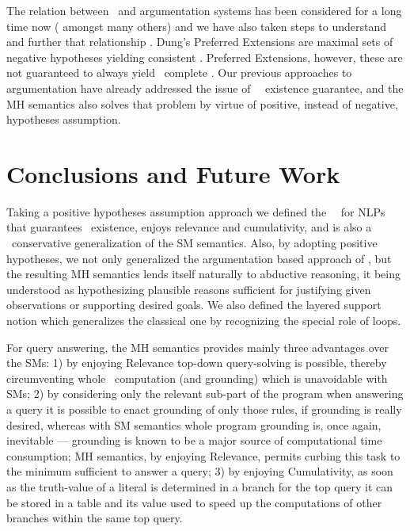 \documentclass{llncs}
\begin{document}
			The relation between \lps\ and argumentation systems has been considered for a long time now
			(\cite{dung95acceptability}	
amongst many others)
			and we have also taken steps to understand and further that relationship
			\cite{Pereira:2007fv,lmp:arg07,lmp_amp_oppositional_concepts_chapter}.
			Dung's Preferred Extensions \cite{dung95acceptability} are maximal sets of negative hypotheses yielding consistent \ms.
			Preferred Extensions, however, these are not guaranteed to always yield \twov\ complete \ms.
			Our previous approaches \cite{Pereira:2007fv,lmp:arg07} to argumentation have already addressed the issue of \twov\ \m\ existence
			guarantee, and the MH semantics also solves that problem by virtue of positive, instead of negative, hypotheses assumption.
					


	\section{Conclusions and Future Work}
		Taking a positive hypotheses assumption approach we defined the \twov\ \MHs\ for NLPs that guarantees \m\ existence, enjoys relevance
		and cumulativity, and is also a \m\ conservative generalization of the SM semantics.
		Also, by adopting positive hypotheses, we not only generalized the argumentation based approach of \cite{dung95acceptability}, but the
		resulting MH semantics lends itself naturally to abductive reasoning, it being understood as hypothesizing plausible reasons sufficient for
		justifying given observations or supporting desired goals.
		We also defined the layered support notion which generalizes the classical one by recognizing the special role of loops.
		
		For query answering, the MH semantics provides mainly three advantages over the SMs:
		1) by enjoying Relevance top-down query-solving is possible, thereby circumventing whole \m\ computation (and grounding) which is
		unavoidable with SMs;
		2) by considering only the relevant sub-part of the program when answering a query it is possible to enact grounding of only those rules, if
		grounding is really desired, whereas with SM semantics whole program grounding is, once again, inevitable --- grounding is known to be a
		major source of computational time consumption; MH semantics, by enjoying Relevance, permits curbing this task to the minimum sufficient
		to answer a query;
		3) by enjoying Cumulativity, as soon as the truth-value of a literal is determined in a branch for the top query it can be stored in a table and
		its value used to speed up the computations of other branches within the same top query.
		
\end{document}
